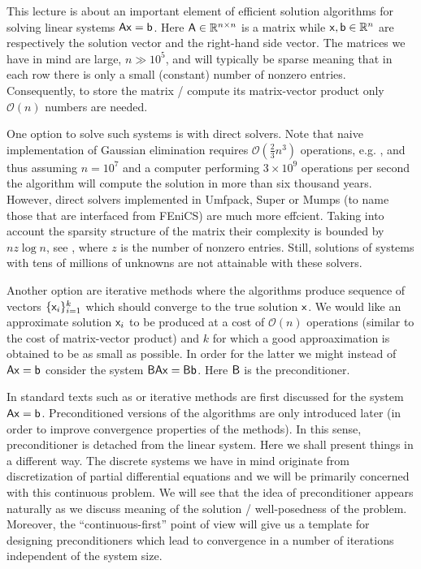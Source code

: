 This lecture is about an important element of efficient solution algorithms for
solving linear systems $\mathsf{A}\mathsf{x}=\mathsf{b}$. Here $\mathsf{A}\in\mathbb{R}^{n\times n}$
is a matrix while $\mathsf{x}, \mathsf{b}\in\mathbb{R}^n$ are respectively the solution vector
and the right-hand side vector. The matrices we have in mind are large, $n \gg
10^5$, and will typically be sparse meaning that in each row there is only a small
(constant) number of nonzero entries. Consequently, to store the matrix / compute its 
matrix-vector product only $\mathcal{O}(n)$ numbers are needed.

One option to solve such systems is with direct solvers. Note that naive
implementation of Gaussian elimination requires $\mathcal{O}(\tfrac{2}{3}n^3)$
operations, e.g. , and thus assuming $n=10^7$ and a computer performing $3\times 10^9$
operations per second the algorithm will compute the solution in more than six
thousand years. However, direct solvers implemented in Umfpack,
Super or Mumps (to name those that are interfaced from FEniCS)
are much more effcient. Taking into account the sparsity structure of the matrix
their complexity is bounded by $n z \log{n}$, see , where $z$ is the number 
of nonzero entries. Still, solutions of systems with tens of millions of unknowns are not
attainable with these solvers.

Another option are iterative methods where the algorithms produce sequence of
vectors $\{\mathsf{x}_i\}_{i=1}^{k}$ which should converge to the true solution $\mathsf{x}$. We
would like an approximate solution $\mathsf{x}_i$ to be produced at a cost of
$\mathcal{O}(n)$ operations (similar to the cost of matrix-vector product) and $k$
for which a good approaximation is obtained to be as small as possible. In order
for the latter we might instead of $\mathsf{A}\mathsf{x}=\mathsf{b}$ consider the system
$\mathsf{B}\mathsf{A}\mathsf{x}=\mathsf{B}\mathsf{b}$. Here $\mathsf{B}$ is the preconditioner.

In standard texts such as  or  iterative methods are
first discussed for the system $\mathsf{A}\mathsf{x}=\mathsf{b}$. Preconditioned versions of
the algorithms are only introduced later (in order to improve convergence
properties of the methods). In this sense, preconditioner is detached from the
linear system. Here we shall present things in a different way. The discrete systems 
we have in mind originate from discretization of partial differential equations and 
we will be primarily concerned with this continuous problem. We will see that the idea 
of preconditioner appears naturally as we discuss meaning of the solution /
well-posedness of the problem. Moreover, the ``continuous-first'' point of view will 
give us a template for designing preconditioners which lead to convergence in a number 
of iterations independent of the system size.
